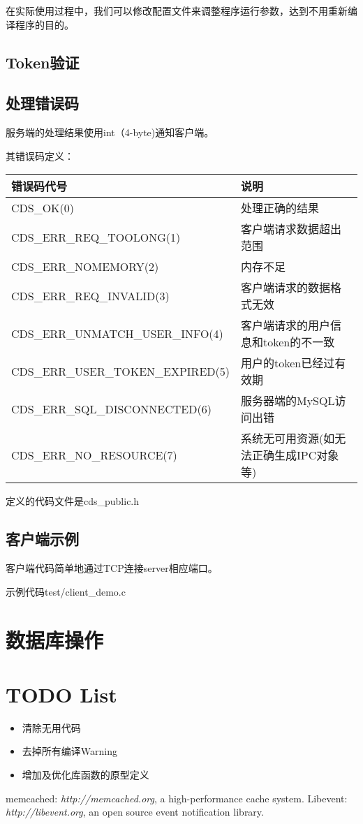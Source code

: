 \documentclass[a4paper]{article}
\begin{document}
在实际使用过程中，我们可以修改配置文件来调整程序运行参数，达到不用重新编译程序的目的。

  
  \subsection{Token验证}
  \subsection{处理错误码}
服务端的处理结果使用int（4-byte)通知客户端。

其错误码定义：

\bgroup
\def\arraystretch{1.15}
\begin{tabular}{|l|l|}
\hline
{错误码代号} & {说明}\\
\hline
{CDS\_OK(0)} & {处理正确的结果}\\
{CDS\_ERR\_REQ\_TOOLONG(1)} & {客户端请求数据超出范围}\\
{CDS\_ERR\_NOMEMORY(2)} & {内存不足}\\
{CDS\_ERR\_REQ\_INVALID(3)} & {客户端请求的数据格式无效}\\
{CDS\_ERR\_UNMATCH\_USER\_INFO(4)} & {客户端请求的用户信息和token的不一致}\\
{CDS\_ERR\_USER\_TOKEN\_EXPIRED(5)} & {用户的token已经过有效期}\\
{CDS\_ERR\_SQL\_DISCONNECTED(6)} & {服务器端的MySQL访问出错}\\
{CDS\_ERR\_NO\_RESOURCE(7)} & {系统无可用资源(如无法正确生成IPC对象等)}\\
\hline
\end{tabular}
\egroup

定义的代码文件是cds\_public.h

  \subsection{客户端示例}
客户端代码简单地通过TCP连接server相应端口。

示例代码test/client\_demo.c

\section{数据库操作}



\section{TODO List}
\begin{itemize}
\item 清除无用代码
\item 去掉所有编译Warning
\item 增加及优化库函数的原型定义
  \end{itemize}

\begin{thebibliography}{99}
memcached: {\em http://memcached.org}, a high-performance cache system.
 Libevent: {\em http://libevent.org}, an open source event notification library.
\end{thebibliography}
\end{document}
